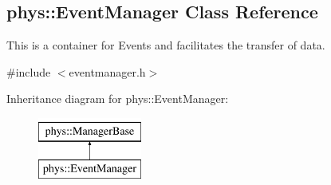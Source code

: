 \hypertarget{classphys_1_1EventManager}{
\subsection{phys::EventManager Class Reference}
\label{da/dde/classphys_1_1EventManager}
}


This is a container for Events and facilitates the transfer of data.  




{\ttfamily \#include $<$eventmanager.h$>$}

Inheritance diagram for phys::EventManager:\begin{figure}[H]
\begin{center}
\leavevmode
\includegraphics[height=2.000000cm]{da/dde/classphys_1_1EventManager}
\end{center}
\end{figure}
